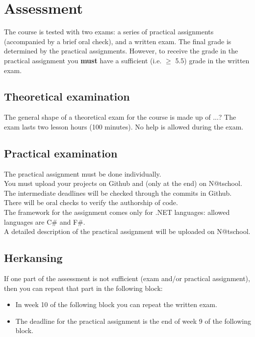 \section{Assessment}
	The course is tested with two exams: a series of practical assignments (accompanied by a brief oral check), and a written exam. The final grade is determined by the practical assignments. However, to receive the grade in the practical assignment you \textbf{must} have a sufficient (i.e. $\geq$ 5.5) grade in the written exam.

	\subsection{Theoretical examination}
		The general shape of a theoretical exam for the course is made up of ...?
		The exam lasts two lesson hours (100 minutes). No help is allowed during the exam.

	\subsection{Practical examination}
	The practical assignment must be done individually. \\
	You must upload your projects on Github and (only at the end) on N@tschool. \\
	The intermediate deadlines will be checked through the commits in Github.\\
	There will be oral checks to verify the authorship of code. \\
	The framework for the assignment comes only for .NET languages: allowed languages are C\# and F\#.  \\ 
	A detailed description of the practical assignment will be uploaded on N@tschool.

	\subsection{Herkansing}
	If one part of the assessment is not sufficient (exam and/or practical assignment), then you can repeat that part in the following block:
	\begin{itemize}
	\item In week 10 of the following block you can repeat the written exam.
	\item The deadline for the practical assignment is the end of week 9 of the following block.
	\end{itemize}
	
